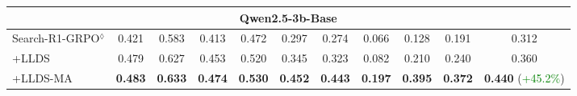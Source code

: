 \begin{table}[t]
{\begin{tabular}{l|ccc|c|cccc|c|c}
\midrule
\multicolumn{11}{c}{Qwen2.5-3b-Base} \\
\midrule
Search-R1-GRPO$^{\lozenge}$ & 0.421 & 0.583 & 0.413 & 0.472 & 0.297 & 0.274 & 0.066 & 0.128 & 0.191 & 0.312 \\
+LLDS      & 0.479 & 0.627 & 0.453 & 0.520 & 0.345 & 0.323 & 0.082 & 0.210 & 0.240 &  0.360  \\
+LLDS-MA        & \textbf{0.483} & \textbf{0.633} & \textbf{0.474} & \textbf{0.530} & \textbf{0.452} & \textbf{0.443} & \textbf{0.197} & \textbf{0.395} & \textbf{0.372} & \textbf{0.440} (\textcolor{green}{+45.2\%})  \\


\end{tabular}}
\end{table}
